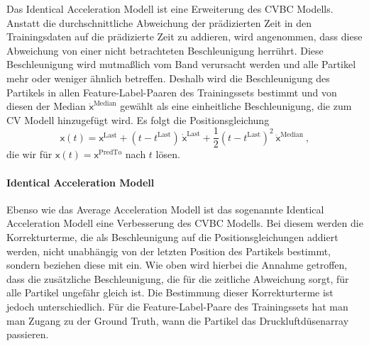 


Das Identical Acceleration Modell ist eine Erweiterung des CVBC Modells.
Anstatt die durchschnittliche Abweichung der prädizierten Zeit in den Trainingsdaten auf die prädizierte Zeit zu addieren, wird angenommen, 
dass diese Abweichung von einer nicht betrachteten Beschleunigung herrührt.
Diese Beschleunigung wird mutmaßlich vom Band verursacht werden und alle Partikel mehr oder weniger ähnlich betreffen.
Deshalb wird die Beschleunigung des Partikels in allen Feature-Label-Paaren des Trainingssets bestimmt
und von diesen der Median \(\ddot{ \mathsf{x}}^{\text{Median}}\) gewählt als eine einheitliche Beschleunigung, die zum CV Modell hinzugefügt wird.
Es folgt die Positionsgleichung
\begin{equation*}
    \mathsf{x}(t) =  \mathsf{x}^{\text{Last}} + (t - t^{\text{Last}}) \: \dot{ \mathsf{x}}^{\text{Last}} 
    + \frac{1}{2} (t - t^{\text{Last}})^2 \: \ddot{ \mathsf{x}}^{\text{Median}} \: ,
\end{equation*}
% 
die wir für \(\mathsf{x}(t) =  \mathsf{x}^{\text{PredTo}}\) nach \(t\) lösen.


\paragraph{Identical Acceleration Modell}


Ebenso wie das Average Acceleration Modell ist das sogenannte Identical Acceleration Modell eine Verbesserung des CVBC Modells. 
Bei diesem werden die Korrekturterme, die als Beschleunigung auf die Positionsgleichungen addiert werden, nicht unabhängig von der letzten Position des Partikels bestimmt, sondern beziehen diese mit ein.
Wie oben wird hierbei die Annahme getroffen, dass die zusätzliche Beschleunigung, die für die zeitliche Abweichung sorgt, für alle Partikel ungefähr gleich ist.
Die Bestimmung dieser Korrekturterme ist jedoch unterschiedlich.
Für die Feature-Label-Paare des Trainingssets hat man man Zugang zu der Ground Truth, wann die Partikel das Druckluftdüsenarray passieren.

